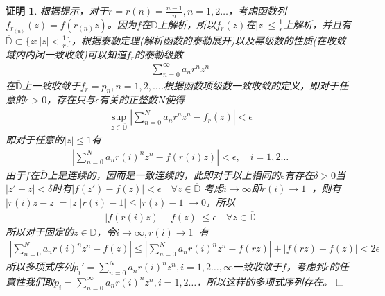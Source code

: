 \documentclass{ctexart}
\newcommand{\。}{．} %
\newenvironment{lanse}{
    \begin{tcolorbox}[breakable,enhanced, colback=qlan, boxrule=0pt, frame hidden,
        borderline west={0.7mm}{0.1mm}{slan}]
    }
    {\end{tcolorbox}}
\theoremstyle{t} %
\newtheorem*{zmhj}{\color{slan} 证明}
\newenvironment{zm}{\begin{lanse}\begin{zmhj}}{$\hfill \square$\end{zmhj}\end{lanse}}
\begin{document}
\begin{zm}
    根据提示，对于$r=r(n)=\frac{n-1}{n},n=1,2\dots$，考虑函数列$f_{r_{(n)}}(z)=f(r_{(n)}z)$。因为$f$在$\mathbb{D}$上解析，所以$f_r(z)$在$|z|\le \frac{1}{r}$上解析，并且有$\overline{\mathbb{D}}\subset \{z:|z|<\frac{1}{r}\}$，根据泰勒定理(解析函数的泰勒展开)以及幂级数的性质(在收敛域内内闭一致收敛)可以知道$f_r$的泰勒级数\begin{align*}
        \sum_{n=0}^{\infty}a_nr^nz^n
    \end{align*}在$\overline{\mathbb{D}}$上一致收敛于$f_r=p_n,n=1,2,\dots$.根据函数项级数一致收敛的定义，即对于任意的$\epsilon>0$，存在只与$\epsilon$有关的正整数$N$使得
    \begin{align*}
        \underset{z\in\overline{\mathbb{D}}}{\sup}\left|\sum_{n=0}^{N}a_nr^nz^n-f_r(z)\right|<\epsilon
    \end{align*}
    即对于任意的$|z|\le 1$有
    \begin{align*}
        \left|\sum_{n=0}^{N}a_nr(i)^nz^n-f(r(i)z)\right|<\epsilon,\quad i=1,2\dots
    \end{align*}
    由于$f$在$\overline{D}$上是连续的，因而是一致连续的，此即对于以上相同的$\epsilon$有存在$\delta>0$当$|z'-z|<\delta$时有$|f(z')-f(z)|<\epsilon\quad \forall z\in\overline{\mathbb{D}}$
    考虑$i\to\infty$即$r(i)\to 1^-$，则有$|r(i)z-z|=|z||r(i)-1|\le |r(i)-1|\to 0$，所以
    \begin{align*}
        |f(r(i)z)-f(z)|\le \epsilon\quad \forall z\in\overline{\mathbb{D}}
    \end{align*}
    所以对于固定的$z\in\overline{\mathbb{D}}$，令$i\to \infty,r(i)\to 1^-$有
    \begin{align*}
        \left|\sum_{n=0}^{N}a_nr(i)^nz^n-f(z)\right|\le \left|\sum_{n=0}^{N}a_nr(i)^nz^n-f(rz)\right|+\left|f(rz)-f(z)\right|<2\epsilon
    \end{align*}
    所以多项式序列$p_i'=\sum_{n=0}^{N}a_nr(i)^nz^n,i=1,2\dots,\infty$一致收敛于$f$，考虑到$\epsilon$的任意性我们取$p_i=\sum_{n=0}^{\infty}a_nr(i)^nz^n,i=1,2\dots$，所以这样的多项式序列存在。
\end{zm}
\end{document}
